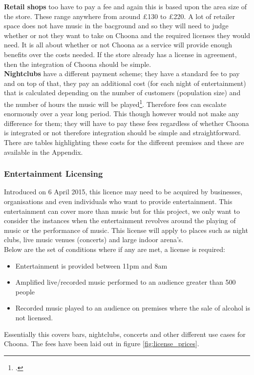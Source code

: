 \textbf{Retail shops} too have to pay a fee and again this is based upon the area size of the store.  These range anywhere from around £130 to £220.  A lot of retailer space does not have music in the bacground and so they will need to judge whether or not they want to take on Choona and the required licenses they would need. It is all about whether or not Choona as a service will provide enough benefits over the costs needed.  If the store already has a license in agreement, then the integration of Choona should be simple.  \\
\textbf{Nightclubs} have a different payment scheme; they have a standard fee to pay and on top of that, they pay an additional cost (for each night of entertainment) that is calculated depending on the number of customers (population size) and the number of hours the music will be played\footcite{ppl}.  Therefore fees can escalate enormously over a year long period.  This though however would not make any difference for them; they will have to pay these fees regardless of whether Choona is integrated or not therefore integration should be simple and straightforward.  
There are tables highlighting these costs for the different premises and these are available in the Appendix.  
      
\subsubsection{Entertainment Licensing}   
Introduced on 6 April 2015, this licence may need to be acquired by businesses, organisations and even individuals who want to provide entertainment.  This entertainment can cover more than music but for this project, we only want to consider the instances when the entertainment revolves around the playing of music or the performance of music.  This license will apply to places such as night clubs, live music venues (concerts) and large indoor arena's.  \\
Below are the set of conditions where if any are met, a license is required:
\begin{itemize}
\item Entertainment is provided between 11pm and 8am
\item Amplified live/recorded music performed to an audience greater than 500 people
\item Recorded music played to an audience on premises where the sale of alcohol is not licensed.
\end{itemize}
Essentially this covers bars, nightclubs, concerts and other different use cases for Choona.  The fees have been laid out in figure \ref{fig:license_prices}.\\ 

